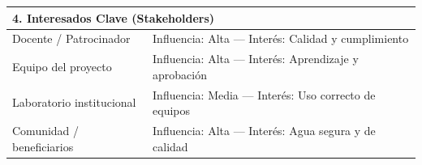 \begin{table}[h]
{\begin{tabularx}{27cm}{|X|X|}
			\multicolumn{2}{|l|}{\textbf{4. Interesados Clave (Stakeholders)}}                                                                                                                                                                                                                                                                                                                                                                                                                                                \\ \hline
			\multicolumn{1}{|l|}{Docente / Patrocinador}          & Influencia: Alta — Interés: Calidad y cumplimiento                                                                                                                                                                                                                                                                                                                                                                                                        \\ \hline
			\multicolumn{1}{|l|}{Equipo del proyecto}             & Influencia: Alta — Interés: Aprendizaje y aprobación                                                                                                                                                                                                                                                                                                                                                                                                      \\ \hline
			\multicolumn{1}{|l|}{Laboratorio institucional}       & Influencia: Media — Interés: Uso correcto de equipos                                                                                                                                                                                                                                                                                                                                                                                                      \\ \hline
			\multicolumn{1}{|l|}{Comunidad / beneficiarios}       & Influencia: Alta — Interés: Agua segura y de calidad                                                                                                                                                                                                                                                                                                                                                                                                      \\ \hline

\end{tabularx}}
\end{table}
